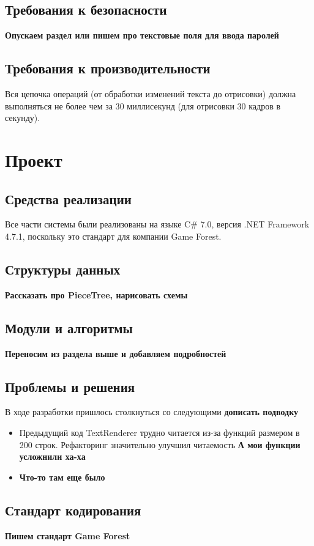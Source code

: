 \documentclass{fefu}
\begin{document}
		\subsection{Требования к безопасности}
			\textbf{Опускаем раздел или пишем про текстовые поля для ввода паролей}
		\subsection{Требования к производительности}
			Вся цепочка операций (от обработки изменений текста до 
			отрисовки) должна выполняться не более чем за 30 миллисекунд (для отрисовки 30 
			кадров в секунду).
	\section{Проект}
		\subsection{Средства реализации}
			Все части системы были реализованы на языке C\# 7.0, 
			версия .NET Framework 4.7.1, поскольку это стандарт для компании Game Forest.
		\subsection{Структуры данных}
			\textbf{Рассказать про PieceTree, нарисовать схемы}
		\subsection{Модули и алгоритмы}
			\textbf{Переносим из раздела выше и добавляем подробностей}
		\subsection{Проблемы и решения}
			\par В ходе разработки пришлось столкнуться со следующими \textbf{дописать 
			подводку}
			\begin{itemize}
				\item Предыдущий код TextRenderer трудно читается из-за функций размером в
				200 строк. Рефакторинг значительно улучшил читаемость \textbf{А мои функции 
				усложнили ха-ха}
				\item \textbf{Что-то там еще было}
			\end{itemize}
		\subsection{Стандарт кодирования}
			\textbf{Пишем стандарт Game Forest}
\end{document}
